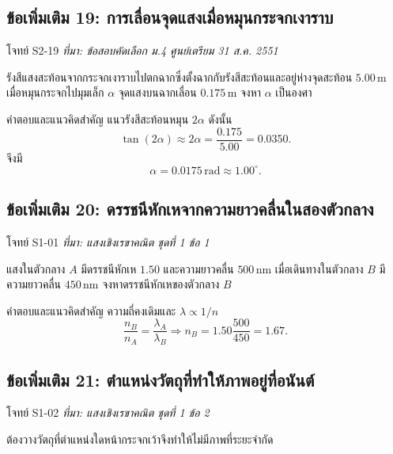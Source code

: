 \subsection{ข้อเพิ่มเติม 19: การเลื่อนจุดแสงเมื่อหมุนกระจกเงาราบ}

\begin{exercisebox}{โจทย์ S2-19}
\textit{ที่มา: ข้อสอบคัดเลือก ม.4 ศูนย์เตรียม 31 ส.ค. 2551}

รังสีแสงสะท้อนจากกระจกเงาราบไปตกฉากซึ่งตั้งฉากกับรังสีสะท้อนและอยู่ห่างจุดสะท้อน $5.00\,\mathrm{m}$ เมื่อหมุนกระจกไปมุมเล็ก $\alpha$ จุดแสงบนฉากเลื่อน $0.175\,\mathrm{m}$ จงหา $\alpha$ เป็นองศา
\end{exercisebox}

\begin{examplebox}{คำตอบและแนวคิดสำคัญ}
แนวรังสีสะท้อนหมุน $2\alpha$ ดังนั้น
\[
\tan(2\alpha)\approx2\alpha=\frac{0.175}{5.00}=0.0350.
\]
จึงมี
\[
\alpha=0.0175\,\mathrm{rad}\approx\boxed{1.00^\circ}.
\]
\end{examplebox}

\subsection{ข้อเพิ่มเติม 20: ดรรชนีหักเหจากความยาวคลื่นในสองตัวกลาง}

\begin{exercisebox}{โจทย์ S1-01}
\textit{ที่มา: แสงเชิงเรขาคณิต ชุดที่ 1 ข้อ 1}

แสงในตัวกลาง $A$ มีดรรชนีหักเห $1.50$ และความยาวคลื่น $500\,\mathrm{nm}$ เมื่อเดินทางในตัวกลาง $B$ มีความยาวคลื่น $450\,\mathrm{nm}$ จงหาดรรชนีหักเหของตัวกลาง $B$
\end{exercisebox}

\begin{examplebox}{คำตอบและแนวคิดสำคัญ}
ความถี่คงเดิมและ $\lambda\propto1/n$
\[
\frac{n_B}{n_A}=\frac{\lambda_A}{\lambda_B}
\Rightarrow n_B=1.50\frac{500}{450}=\boxed{1.67}.
\]
\end{examplebox}

\subsection{ข้อเพิ่มเติม 21: ตำแหน่งวัตถุที่ทำให้ภาพอยู่ที่อนันต์}

\begin{exercisebox}{โจทย์ S1-02}
\textit{ที่มา: แสงเชิงเรขาคณิต ชุดที่ 1 ข้อ 2}

ต้องวางวัตถุที่ตำแหน่งใดหน้ากระจกเว้าจึงทำให้ไม่มีภาพที่ระยะจำกัด
\end{exercisebox}


